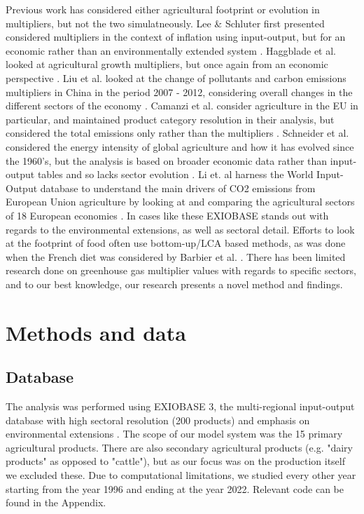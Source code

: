 \documentclass[a4paper,twoside]{article}
\begin{document}
Previous work has considered either agricultural footprint or evolution in multipliers, but not the two simulatneously. Lee \& Schluter first presented considered multipliers in the context of inflation using input-output, but for an economic rather than an environmentally extended system \cite{Lee1977}. Haggblade et al. looked at agricultural growth multipliers, but once again from an economic perspective \cite{haggblade1991modeling}. Liu et al. looked at the change of pollutants and carbon emissions multipliers in China in the period 2007 - 2012, considering overall changes in the different sectors of the economy \cite{Liu2017}. Camanzi et al. consider agriculture in the EU in particular, and maintained product category resolution in their analysis, but considered the total emissions only rather than the multipliers \cite{Camanzi2017}. Schneider et al. considered the energy intensity of global agriculture and how it has evolved since the 1960's, but the analysis is based on broader economic data rather than input-output tables and so lacks sector evolution \cite{Schneider2009}. Li et. al harness the World Input-Output database to understand the main drivers of CO2 emissions from European Union agriculture by looking at and comparing the agricultural sectors of 18 European economies \cite{Li2016}. In cases like these EXIOBASE stands out with regards to the environmental extensions, as well as sectoral detail. Efforts to look at the footprint of food often use bottom-up/LCA based methods, as was done when the French diet was considered by Barbier et al. \cite{Barbier2019}. There has been limited research done on greenhouse gas multiplier values with regards to specific sectors, and to our best knowledge, our research presents a novel method and findings.

\section{Methods and data}

\subsection{Database}

The analysis was performed using EXIOBASE 3, the multi-regional input-output database with high sectoral resolution (200 products) and emphasis on environmental extensions \cite{Stadler2018}. The scope of our model system was the 15 primary agricultural products. There are also secondary agricultural products (e.g. "dairy products" as opposed to "cattle"), but as our focus was on the production itself we excluded these. Due to computational limitations, we studied every other year starting from the year 1996 and ending at the year 2022. Relevant code can be found in the Appendix.
\end{document}
